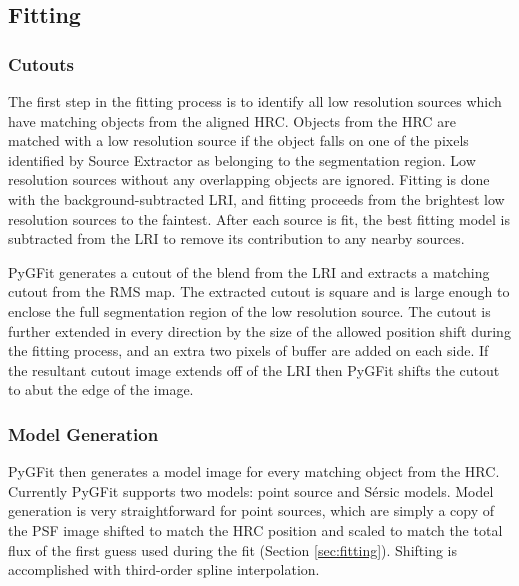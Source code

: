 \documentclass[apj]{emulateapj}
\newcommand{\sersic}{S\'{e}rsic}
\newcommand{\pygfit}{PyGFit}
\newcommand{\extractor}{Source Extractor}
\begin{document}

\subsection{Fitting}\label{sec:fitting_procedure}

\subsubsection{Cutouts}

The first step in the fitting process is to identify all low resolution sources which have matching objects from the aligned HRC.  Objects from the HRC are matched with a low resolution source if the object falls on one of the pixels identified by \extractor{} as belonging to the segmentation region.  Low resolution sources without any overlapping objects are ignored.  Fitting is done with the background-subtracted LRI, and fitting proceeds from the brightest low resolution sources to the faintest.  After each source is fit, the best fitting model is subtracted from the LRI to remove its contribution to any nearby sources.

\pygfit{} generates a cutout of the blend from the LRI and extracts a matching cutout from the RMS map.  The extracted cutout is square and is large enough to enclose the full segmentation region of the low resolution source.  The cutout is further extended in every direction by the size of the allowed position shift during the fitting process, and an extra two pixels of buffer are added on each side.  If the resultant cutout image extends off of the LRI then \pygfit{} shifts the cutout to abut the edge of the image.

\subsubsection{Model Generation}\label{sec:modeling}

\pygfit{} then generates a model image for every matching object from the HRC.  Currently \pygfit{} supports two models: point source and \sersic{} models.  Model generation is very straightforward for point sources, which are simply a copy of the PSF image shifted to match the HRC position and scaled to match the total flux of the first guess used during the fit (Section \ref{sec:fitting}).  Shifting is accomplished with third-order spline interpolation.
\end{document}
